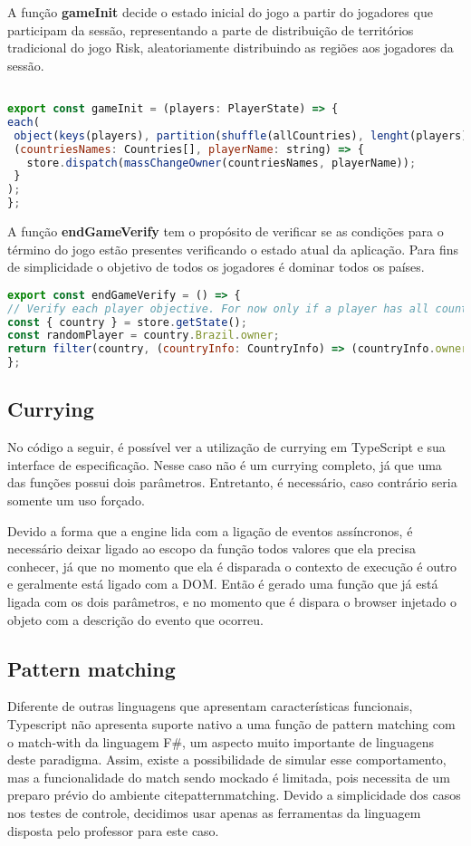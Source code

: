 \documentclass[rel_mlp]{iiufrgs}
\begin{document}
A função \textbf{gameInit} decide o estado inicial do jogo a partir do jogadores que participam da sessão, representando a parte de distribuição de territórios tradicional do jogo Risk, aleatoriamente distribuindo as regiões aos jogadores da sessão.
\begin{lstlisting}[language = JavaScript]

export const gameInit = (players: PlayerState) => {
each(
 object(keys(players), partition(shuffle(allCountries), lenght(players))) as InitCountries,
 (countriesNames: Countries[], playerName: string) => {
   store.dispatch(massChangeOwner(countriesNames, playerName));
 }
);
};
\end{lstlisting}

A função \textbf{endGameVerify} tem o propósito de verificar se as condições para o término do jogo estão presentes verificando o estado atual da aplicação. Para fins de simplicidade o objetivo de todos os jogadores é dominar todos os países.
\begin{lstlisting}[language = JavaScript]
export const endGameVerify = () => {
// Verify each player objective. For now only if a player has all countries
const { country } = store.getState();
const randomPlayer = country.Brazil.owner;
return filter(country, (countryInfo: CountryInfo) => (countryInfo.owner !== randomPlayer)) === [];
};


\end{lstlisting}

\subsection{Currying}
No código a seguir, é possível ver a utilização de currying em TypeScript e sua interface de especificação. Nesse caso não é um currying completo, já que uma das funções possui dois parâmetros. Entretanto, é necessário, caso contrário seria somente um uso forçado. \par
Devido a forma que a engine lida com a ligação de eventos assíncronos, é necessário deixar ligado ao escopo da função todos valores que ela precisa conhecer, já que no momento que ela é disparada o contexto de execução é outro e geralmente está ligado com a DOM. Então é gerado uma função que já está ligada com os dois parâmetros, e no momento que é dispara o browser injetado o objeto com a descrição do evento que ocorreu.


\subsection{Pattern matching}
Diferente de outras linguagens que apresentam características funcionais, Typescript não apresenta suporte nativo a uma função de pattern matching com o match-with da linguagem F\#, um aspecto muito importante de linguagens deste paradigma. Assim, existe a possibilidade de simular esse comportamento, mas a funcionalidade do match sendo mockado é limitada, pois necessita de um preparo prévio do ambiente cite{patternmatching}. Devido a simplicidade dos casos nos testes de controle, decidimos usar apenas as ferramentas da linguagem disposta pelo professor para este caso.
\end{document}

